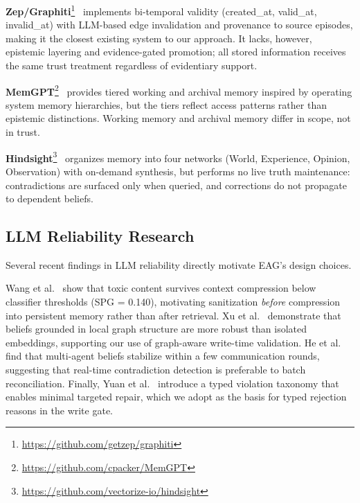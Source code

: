 \documentclass[11pt,letterpaper]{article}
\begin{document}
\textbf{Zep/Graphiti}\footnote{\url{https://github.com/getzep/graphiti}}~\cite{graphiti2025} implements bi-temporal validity (created\_at, valid\_at, invalid\_at) with LLM-based edge invalidation and provenance to source episodes, making it the closest existing system to our approach. It lacks, however, epistemic layering and evidence-gated promotion; all stored information receives the same trust treatment regardless of evidentiary support.

\textbf{MemGPT}\footnote{\url{https://github.com/cpacker/MemGPT}}~\cite{memgpt2023} provides tiered working and archival memory inspired by operating system memory hierarchies, but the tiers reflect access patterns rather than epistemic distinctions. Working memory and archival memory differ in scope, not in trust.

\textbf{Hindsight}\footnote{\url{https://github.com/vectorize-io/hindsight}}~\cite{hindsight} organizes memory into four networks (World, Experience, Opinion, Observation) with on-demand synthesis, but performs no live truth maintenance: contradictions are surfaced only when queried, and corrections do not propagate to dependent beliefs.

\subsection{LLM Reliability Research}

Several recent findings in LLM reliability directly motivate EAG's design choices.

Wang et al.~\cite{wang2026contamination} show that toxic content survives context compression below classifier thresholds (SPG = 0.140), motivating sanitization \textit{before} compression into persistent memory rather than after retrieval. Xu et al.~\cite{xu2026ncb} demonstrate that beliefs grounded in local graph structure are more robust than isolated embeddings, supporting our use of graph-aware write-time validation. He et al.~\cite{he2026collective} find that multi-agent beliefs stabilize within a few communication rounds, suggesting that real-time contradiction detection is preferable to batch reconciliation. Finally, Yuan et al.~\cite{yuan2026saver} introduce a typed violation taxonomy that enables minimal targeted repair, which we adopt as the basis for typed rejection reasons in the write gate.
\end{document}
